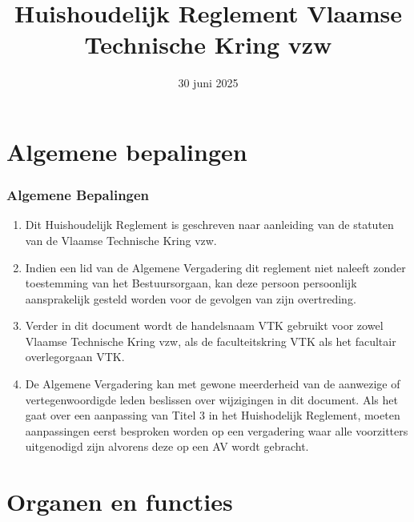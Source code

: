 




\title{Huishoudelijk Reglement Vlaamse Technische Kring vzw}
\date{30 juni 2025}

\maketitle

\part{Algemene bepalingen}\label{art:alg_bepalingen}
\section{Algemene Bepalingen}
\begin{enumerate}
    \item Dit Huishoudelijk Reglement is geschreven naar aanleiding van de statuten van de Vlaamse Technische Kring vzw.
    \item Indien een lid van de Algemene Vergadering dit reglement niet naleeft zonder toestemming van het Bestuursorgaan, kan deze persoon persoonlijk aansprakelijk gesteld worden voor de gevolgen van zijn overtreding.
    \item Verder in dit document wordt de handelsnaam VTK gebruikt voor zowel Vlaamse Technische Kring vzw, als de faculteitskring VTK als het facultair overlegorgaan VTK.
    \item De Algemene Vergadering kan met gewone meerderheid van de aanwezige of vertegenwoordigde leden beslissen over wijzigingen in dit document. Als het gaat over een aanpassing van Titel 3 in het Huishodelijk Reglement, moeten aanpassingen eerst besproken worden op een vergadering waar alle voorzitters uitgenodigd zijn alvorens deze op een AV wordt gebracht.
\end{enumerate}

\part{Organen en functies}
